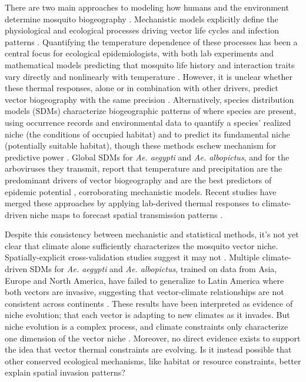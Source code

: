 There are two main approaches to modeling how humans and the environment determine mosquito biogeography \cite{Tjaden2018-zi}. Mechanistic models explicitly define the physiological and ecological processes driving vector life cycles and infection patterns \cite{Costa2010-cx, Carrington2013-qp, Mordecai2013-sb}. Quantifying the temperature dependence of these processes has been a central focus for ecological epidemiologists, with both lab experiments and mathematical models predicting that mosquito life history and interaction traits vary directly and nonlinearly with temperature \cite{Brown2004-cw, Mordecai2017-tb, Shocket2018-xi}. However, it is unclear whether these thermal responses, alone or in combination with other drivers, predict vector biogeography with the same precision \cite{Tjaden2018-zi}. Alternatively, species distribution models (SDMs) characterize biogeographic patterns of where species are present, using occurrence records and environmental data to quantify a species’ realized niche (the conditions of occupied habitat) and to predict its fundamental niche (potentially suitable habitat), though these methods eschew mechanism for predictive power \cite{Grinnell1917-aa, Soberon2005-cn, Wiens2009-sb}. Global SDMs for \textit{Ae. aegypti} and \textit{Ae. albopictus}, and for the arboviruses they transmit, report that temperature and precipitation are the predominant drivers of vector biogeography and are the best predictors of epidemic potential \cite{Brady2014-ti, Liu-Helmersson2014-cd, Kraemer2015-ct}, corroborating mechanistic models. Recent studies have merged these approaches by applying lab-derived thermal responses to climate-driven niche maps to forecast spatial transmission patterns \cite{Tjaden2017-af, Mweya2016-cv}. 

Despite this consistency between mechanistic and statistical methods, it’s not yet clear that climate alone sufficiently characterizes the mosquito vector niche. Spatially-explicit cross-validation studies suggest it may not \cite{Liu2020-wk}. Multiple climate-driven SDMs for \textit{Ae. aegypti} and \textit{Ae. albopictus}, trained on data from Asia, Europe and North America, have failed to generalize to Latin America where both vectors are invasive, suggesting that vector-climate relationships are not consistent across continents \cite{Medley2010-fa, Carlson2016-rc, Pech-May2016-vs}. These results have been interpreted as evidence of niche evolution; that each vector is adapting to new climates as it invades. But niche evolution is a complex process, and climate constraints only characterize one dimension of the vector niche \cite{Wiens2010-ce, Hortal2015-gc, Diniz-Filho2019-cd}. Moreover, no direct evidence exists to support the idea that vector thermal constraints are evolving. Is it instead possible that other conserved ecological mechanisms, like habitat or resource constraints, better explain spatial invasion patterns?

